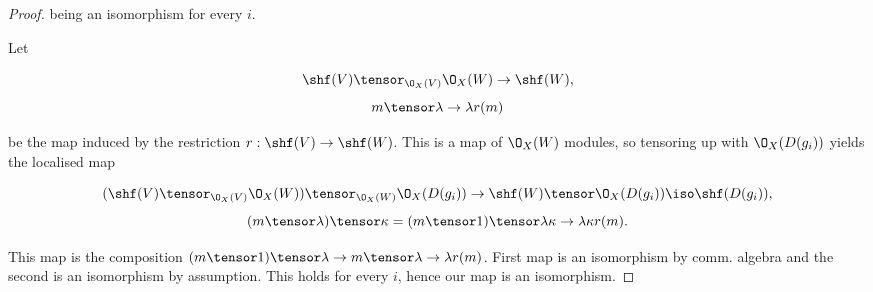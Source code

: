 \begin{proof}
being an isomorphism for every $i$.

Let 

\[\shf(V)\tensor_{\O_X(V)} \O_X(W) \rightarrow \shf(W),\]
\[m \tensor \lambda \to \lambda r(m)\]

be the map induced by the restriction $r:\shf(V) \rightarrow \shf(W)$.
This is a map of $\O_X(W)$ modules, so tensoring up with $\O_X(D(g_i))$ yields the localised map

\[(\shf(V)\tensor_{\O_X(V)}  \O_X(W)) \tensor_{\O_X(W)} \O_X(D(g_i)) \rightarrow \shf(W) \tensor \O_X(D(g_i)) \iso \shf(D(g_i)),\]
\[(m \tensor \lambda)\tensor \kappa = (m\tensor 1) \tensor \lambda \kappa \to \lambda \kappa r(m).\]

This map is the composition  $(m\tensor 1) \tensor \lambda \rightarrow m\tensor \lambda \rightarrow \lambda r(m)$.
First map is an isomorphism by comm. algebra and the second is an isomorphism by assumption.
This holds for every $i$, hence our map is an isomorphism.
\end{proof}